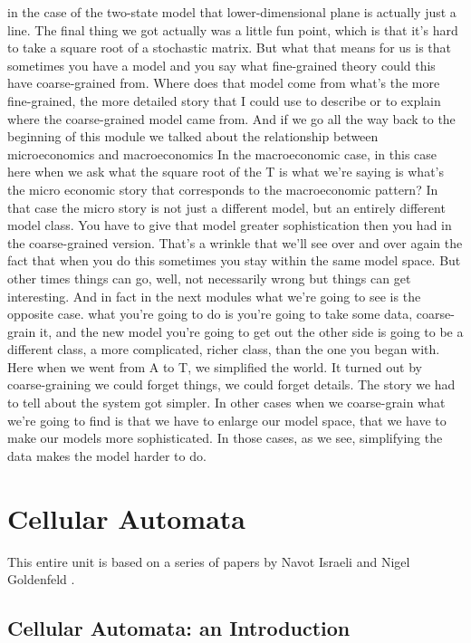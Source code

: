 \documentclass[]{article}
\begin{document}
in the case of the two-state model that
lower-dimensional plane is actually just a line.
The final thing we got
actually was a little fun point,
which is that it's hard to take
a square root of a stochastic matrix.
But what that means for us is that
sometimes you have a model
and you say what fine-grained theory
could this have coarse-grained from.
Where does that model come from
what's the more fine-grained,
the more detailed story
that I could use to describe or to explain
where the coarse-grained model came from.
And if we go all the way back
to the beginning of this module
we talked about the relationship between
microeconomics and macroeconomics
In the macroeconomic case,
in this case here when we ask what
the square root of the T is what we're saying is
what's the micro economic story that
corresponds to the macroeconomic pattern?
In that case the micro story is
not just a different model,
but an entirely different model class.
You have to give that model
greater sophistication
then you had in the coarse-grained
version.
That's a wrinkle that we'll see
over and over again
the fact that when you do this sometimes
you stay within the same model space.
But other times things can go, well,
not necessarily wrong
but things can get interesting.
And in fact in the next modules
what we're going to see is
the opposite case.
what you're going to do is you're
going to take some data,
coarse-grain it,
and the new model you're going
to get out the other side
is going to be a different class,
a more complicated, richer class,
than the one you began with.
Here when we went from A to T, we simplified the world.
It turned out by coarse-graining
we could forget things,
we could forget details.
The story we had to tell about the system
got simpler.
In other cases when we coarse-grain
what we're going to find is that
we have to enlarge our model space,
that we have to make our models
more sophisticated.
In those cases, as we see,
simplifying the data makes
the model harder to do. \cite{dedeo2016conflict}

\section{Cellular Automata}

This entire unit is based on a series of papers by Navot Israeli and Nigel Goldenfeld \cite{israeli2004computational,israeli2006coarse}.
\subsection{Cellular Automata: an Introduction}
\end{document}
